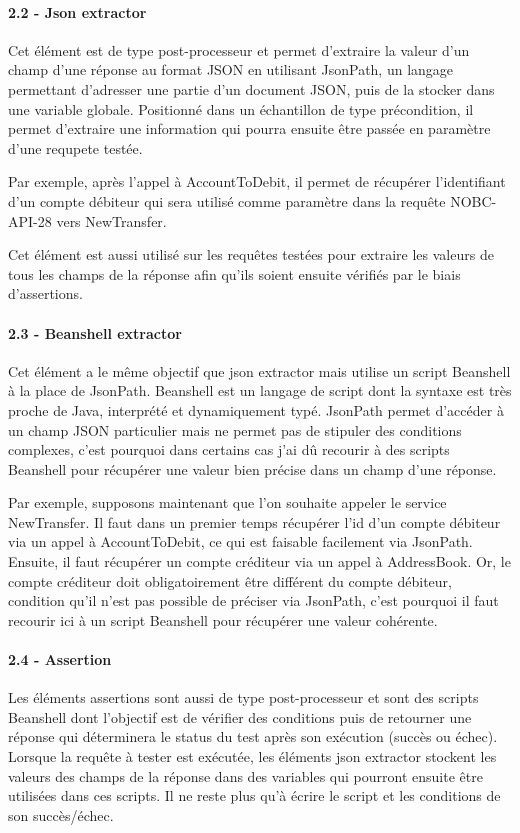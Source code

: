 	\paragraph{2.2 - Json extractor}
	Cet élément est de type post-processeur et permet d'extraire la valeur d'un champ d'une réponse au format JSON en utilisant JsonPath, un langage permettant d'adresser une partie d'un document JSON, puis de la stocker dans une variable globale. Positionné dans un échantillon de type précondition, il permet d'extraire une information qui pourra ensuite être passée en paramètre d'une requpete testée.
	
	Par exemple, après l'appel à AccountToDebit, il permet de récupérer l'identifiant d'un compte débiteur qui sera utilisé comme paramètre dans la requête NOBC-API-28 vers NewTransfer.
	
	Cet élément est aussi utilisé sur les requêtes testées pour extraire les valeurs de tous les champs de la réponse afin qu'ils soient ensuite vérifiés par le biais d'assertions.
	
	\paragraph{2.3 - Beanshell extractor}
	Cet élément a le même objectif que json extractor mais utilise un script Beanshell à la place de JsonPath. Beanshell est un langage de script dont la syntaxe est très proche de Java, interprété et dynamiquement typé. JsonPath permet d'accéder à un champ JSON particulier mais ne permet pas de stipuler des conditions complexes, c'est pourquoi dans certains cas j'ai dû recourir à des scripts Beanshell pour récupérer une valeur bien précise dans un champ d'une réponse.
	
	Par exemple, supposons maintenant que l'on souhaite appeler le service NewTransfer. Il faut dans un premier temps récupérer l'id d'un compte débiteur via un appel à AccountToDebit, ce qui est faisable facilement via JsonPath. Ensuite, il faut récupérer un compte créditeur via un appel à AddressBook. Or, le compte créditeur doit obligatoirement être différent du compte débiteur, condition qu'il n'est pas possible de préciser via JsonPath, c'est pourquoi il faut recourir ici à un script Beanshell pour récupérer une valeur cohérente.
	
	\paragraph{2.4 - Assertion}
	Les éléments assertions sont aussi de type post-processeur et sont des scripts Beanshell dont l'objectif est de vérifier des conditions puis de retourner une réponse qui déterminera le status du test après son exécution (succès ou échec). Lorsque la requête à tester est exécutée, les éléments json extractor stockent les valeurs des champs de la réponse dans des variables qui pourront ensuite être utilisées dans ces scripts. Il ne reste plus qu'à écrire le script et les conditions de son succès/échec.
	
